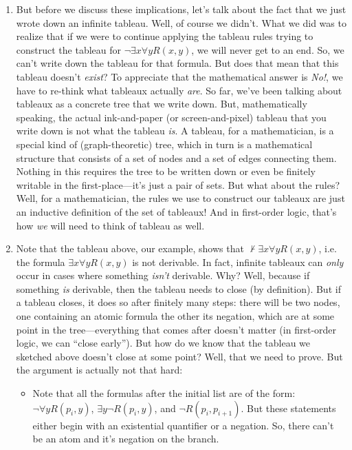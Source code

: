 \begin{enumerate}[\thesection.1]
	\item But before we discuss these implications, let's talk about the fact that we just wrote down an infinite tableau. Well, of course we didn't. What we did was to realize that if we were to continue applying the tableau rules trying to construct the tableau for $\neg\exists x\forall yR(x,y)$, we will never get to an end. So, we can't write down the tableau for that formula. But does that mean that this tableau doesn't \emph{exist}? To appreciate that the mathematical answer is \emph{No!}, we have to re-think what tableaux actually \emph{are}. So far, we've been talking about tableaux as a concrete tree that we write down. But, mathematically speaking, the actual ink-and-paper (or screen-and-pixel) tableau that you write down is not what the tableau \emph{is}. A tableau, for a mathematician, is a special kind of (graph-theoretic) tree, which in turn is a mathematical structure that consists of a set of nodes and a set of edges connecting them. Nothing in this requires the tree to be written down or even be finitely writable in the first-place---it's just a pair of sets. But what about the rules? Well, for a mathematician, the rules we use to construct our tableaux are just an inductive definition of the set of tableaux! And in first-order logic, that's how \emph{we} will need to think of tableau as well.
	
	\item Note that the tableau above, our example, shows that $\nvdash\exists x\forall yR(x,y)$, i.e. the formula $\exists x\forall yR(x,y)$ is not derivable. In fact, infinite tableaux can \emph{only} occur in cases where something \emph{isn't} derivable. Why? Well, because if something \emph{is} derivable, then the tableau needs to close (by definition). But if a tableau closes, it does so after finitely many steps: there will be two nodes, one containing an atomic formula the other its negation, which are at some point in the tree---everything that comes after doesn't matter (in first-order logic, we can ``close early''). But how do we know that the tableau we sketched above doesn't close at some point? Well, that we need to prove. But the argument is actually not that hard:
	
	\begin{itemize}
	
		\item Note that all the formulas after the initial list are of the form: $\neg \forall yR(p_i, y)$, $\exists y\neg R(p_i, y)$, and $\neg R(p_i, p_{i+1})$. But these statements either begin with an existential quantifier or a negation. So, there can't be an atom and it's negation on the branch.
		

\end{itemize}
\end{enumerate}
